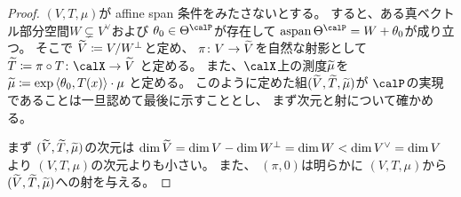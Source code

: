 \documentclass[report]{jlreq}
\begin{document}
\begin{proof}
    $(V, T, \mu)$が affine span 条件をみたさないとする。
    すると、ある真ベクトル部分空間$W \subsetneq V^\vee$および
    $\theta_0 \in \Theta^\calP$が存在して
    $\aspan\Theta^\calP = W + \theta_0$が成り立つ。
    そこで
    $\widetilde{V} \coloneqq V / W^\perp$と定め、
    $\pi \colon V \to \widetilde{V}$を自然な射影として
    $\wt{T} \coloneqq \pi \circ T \colon \calX \to \wt{V}$
    と定める。
    また、$\calX$上の測度$\widetilde{\mu}$を
    $\widetilde{\mu} \coloneqq \exp\left\langle{\theta_0},{T(x)}\right\rangle \cdot \mu$
    と定める。
    このように定めた組$(\widetilde{V}, \widetilde{T}, \widetilde{\mu})$が
    $\calP$の実現であることは一旦認めて最後に示すこととし、
    まず次元と射について確かめる。

    まず
    $(\widetilde{V}, \widetilde{T}, \widetilde{\mu})$の次元は
    $\dim \widetilde{V} = \dim V - \dim W^\perp = \dim W < \dim V^\vee = \dim V$
    より
    $(V, T, \mu)$の次元よりも小さい。
    また、
    $(\pi, 0)$は明らかに
    $(V, T, \mu)$から$(\widetilde{V}, \widetilde{T}, \widetilde{\mu})$への射を与える。


\end{proof}
\end{document}
